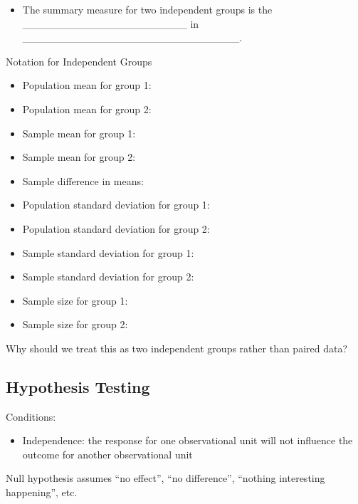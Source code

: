 \documentclass[
]{report}
\providecommand{\tightlist}{%
  \setlength{\itemsep}{0pt}\setlength{\parskip}{0pt}}
\begin{document}
\begin{itemize}
\tightlist
\item
  The summary measure for two independent groups is the \_\_\_\_\_\_\_\_\_\_\_\_\_\_\_\_\_\_\_\_\_\_ in \_\_\_\_\_\_\_\_\_\_\_\_\_\_\_\_\_\_\_\_\_\_\_\_\_\_\_\_\_.
\end{itemize}



Notation for Independent Groups

\begin{itemize}
\item
  Population mean for group 1:
\item
  Population mean for group 2:
\item
  Sample mean for group 1:
\item
  Sample mean for group 2:
\item
  Sample difference in means:
\item
  Population standard deviation for group 1:
\item
  Population standard deviation for group 2:
\item
  Sample standard deviation for group 1:
\item
  Sample standard deviation for group 2:
\item
  Sample size for group 1:
\item
  Sample size for group 2:
\end{itemize}


Why should we treat this as two independent groups rather than paired data?

\vspace{0.6in}

\subsection*{Hypothesis Testing}\label{hypothesis-testing-6}

Conditions:

\begin{itemize}
\tightlist
\item
  Independence: the response for one observational unit will not influence the outcome for another observational unit
\end{itemize}

Null hypothesis assumes ``no effect'', ``no difference'', ``nothing interesting happening'', etc.
\end{document}
